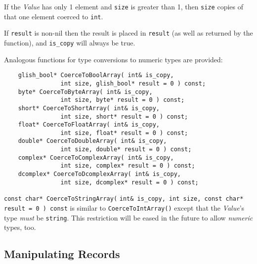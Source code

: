 \begin{sloppy}
\begin{list}{}{}
If the {\em Value} has only 1 element and {\tt size} is greater than 1,
then {\tt size} copies of that one element coerced to {\tt int}.

If {\tt result} is non-nil then the result is placed in {\tt result}
(as well as returned by the function), and {\tt is\_copy} will always
be true.

Analogous functions for type conversions to numeric types are provided:
\begin{verbatim}
    glish_bool* CoerceToBoolArray( int& is_copy,
                int size, glish_bool* result = 0 ) const;
    byte* CoerceToByteArray( int& is_copy,
                int size, byte* result = 0 ) const;
    short* CoerceToShortArray( int& is_copy,
                int size, short* result = 0 ) const;
    float* CoerceToFloatArray( int& is_copy,
                int size, float* result = 0 ) const;
    double* CoerceToDoubleArray( int& is_copy,
                int size, double* result = 0 ) const;
    complex* CoerceToComplexArray( int& is_copy,
                int size, complex* result = 0 ) const;
    dcomplex* CoerceToDcomplexArray( int& is_copy,
                int size, dcomplex* result = 0 ) const;
\end{verbatim}

\item[{\tt const char* CoerceToStringArray(}] {\tt int\& is\_copy, int size,
const char* result = 0 ) const}
is similar to {\tt CoerceToIntArray()}
except that the {\em Value\/}'s type {\em must} be {\tt string}.
This restriction will be eased in the future to allow {\em numeric} types,
too.

\end{list}
\end{sloppy}

\subsection{Manipulating Records}

